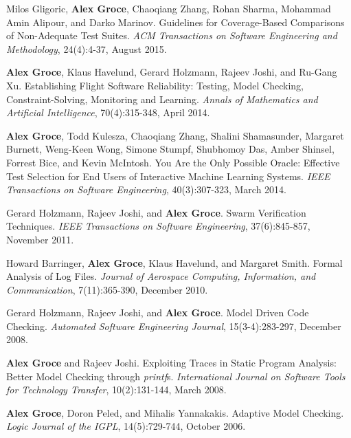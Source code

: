 \documentclass[ComputerScience]{vita}
\begin{document}
\begin{vita}
\begin{Refereed Journal Publications}
\item
Milos Gligoric, {\bf Alex Groce}, Chaoqiang Zhang, Rohan Sharma, Mohammad Amin Alipour, and Darko Marinov.
\newblock Guidelines for Coverage-Based Comparisons of Non-Adequate Test Suites.
\newblock \emph{ACM Transactions on Software Engineering and Methodology}, 24(4):4-37, August 2015.

\item
{\bf Alex Groce}, Klaus Havelund, Gerard Holzmann, Rajeev Joshi, and Ru-Gang Xu.
\newblock Establishing Flight Software Reliability: Testing, Model Checking, Constraint-Solving, Monitoring and Learning.
\newblock \emph{Annals of Mathematics and Artificial Intelligence}, 70(4):315-348, April 2014.

\item
{\bf Alex Groce}, Todd Kulesza, Chaoqiang Zhang, Shalini Shamasunder, Margaret Burnett, Weng-Keen Wong, Simone Stumpf, Shubhomoy Das, Amber Shinsel, Forrest Bice, and Kevin McIntosh.
\newblock You Are the Only Possible Oracle: Effective Test Selection for End Users of Interactive Machine Learning Systems.
\newblock \emph{IEEE Transactions on Software Engineering}, 40(3):307-323, March 2014.

\item 
Gerard Holzmann, Rajeev Joshi, and {\bf Alex Groce}.
\newblock Swarm Verification Techniques.
\newblock \emph{IEEE Transactions on Software Engineering}, 37(6):845-857, November 2011.

\item
Howard Barringer, {\bf Alex Groce}, Klaus Havelund, and Margaret Smith.
\newblock Formal Analysis of Log Files.
\newblock \emph{Journal of Aerospace Computing, Information, and Communication}, 7(11):365-390, December 2010.

\item Gerard Holzmann, Rajeev Joshi, and {\bf Alex Groce}.
\newblock Model Driven Code Checking.
\newblock \emph{Automated Software Engineering Journal}, 15(3-4):283-297, December 2008.

\item
{\bf Alex Groce} and Rajeev Joshi.
\newblock Exploiting Traces in Static Program Analysis: Better Model Checking through \emph{printf}s.
\newblock \emph{International Journal on Software Tools for Technology Transfer}, 10(2):131-144, March 2008.

\item
{\bf Alex Groce}, Doron Peled, and Mihalis Yannakakis.
\newblock Adaptive Model Checking.
\newblock \emph{Logic Journal of the IGPL}, 14(5):729-744, October 2006.


\end{Refereed Journal Publications}
\end{vita}
\end{document}
